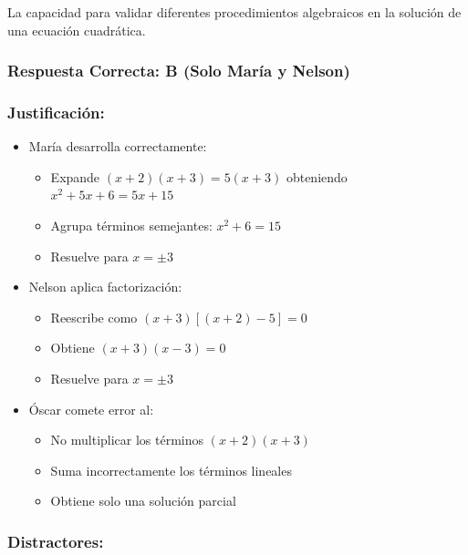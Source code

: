\documentclass[
]{article}
\providecommand{\tightlist}{%
  \setlength{\itemsep}{0pt}\setlength{\parskip}{0pt}}
\begin{document}
La capacidad para validar diferentes procedimientos algebraicos en la
solución de una ecuación cuadrática.

\subsubsection{Respuesta Correcta: B (Solo María y
Nelson)}\label{respuesta-correcta-b-solo-maruxeda-y-nelson}

\subsubsection{Justificación:}\label{justificaciuxf3n-1}

\begin{itemize}
\tightlist
\item
  María desarrolla correctamente:

  \begin{itemize}
  \tightlist
  \item
    Expande \((x + 2)(x + 3) = 5(x + 3)\) obteniendo
    \(x^2 + 5x + 6 = 5x + 15\)
  \item
    Agrupa términos semejantes: \(x^2 + 6 = 15\)
  \item
    Resuelve para \(x = \pm 3\)
  \end{itemize}
\item
  Nelson aplica factorización:

  \begin{itemize}
  \tightlist
  \item
    Reescribe como \((x + 3)[(x + 2) - 5] = 0\)
  \item
    Obtiene \((x + 3)(x - 3) = 0\)
  \item
    Resuelve para \(x = \pm 3\)
  \end{itemize}
\item
  Óscar comete error al:

  \begin{itemize}
  \tightlist
  \item
    No multiplicar los términos \((x + 2)(x + 3)\)
  \item
    Suma incorrectamente los términos lineales
  \item
    Obtiene solo una solución parcial
  \end{itemize}
\end{itemize}

\subsubsection{Distractores:}\label{distractores-1}
\end{document}
